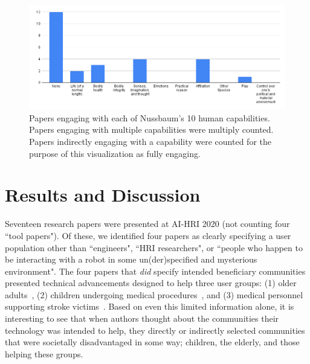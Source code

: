 \documentclass[letterpaper]{article} %
\begin{document}
\begin{figure}[!ht]
\centering
\includegraphics[width=\linewidth]{chart}
\caption{Papers engaging with each of Nussbaum's 10 human capabilities. Papers engaging with multiple capabilities were multiply counted. Papers indirectly engaging with a capability were counted for the purpose of this visualization as fully engaging.}
\label{fig:chart}
\end{figure}

\section{Results and Discussion}
Seventeen research papers were presented at AI-HRI 2020 (not counting four ``tool papers"). Of these, we identified four papers as clearly specifying a user population other than ``engineers", ``HRI researchers", or ``people who happen to be interacting with a robot in some un(der)specified and mysterious environment". The four papers that \textit{did} specify intended beneficiary communities presented technical advancements designed to help three user groups: (1) older adults~\cite{reneau2020supporting,wilson2020knowledge}, (2) children undergoing medical procedures~\cite{foster2020towards}, and (3) medical personnel supporting stroke victims~\cite{pourebadi2020stroke}. Based on even this limited information alone, it is interesting to see that when authors  thought about the communities their technology was intended to help, they directly or indirectly selected communities that were societally disadvantaged in some way; children, the elderly, and those helping these groups.
\end{document}
